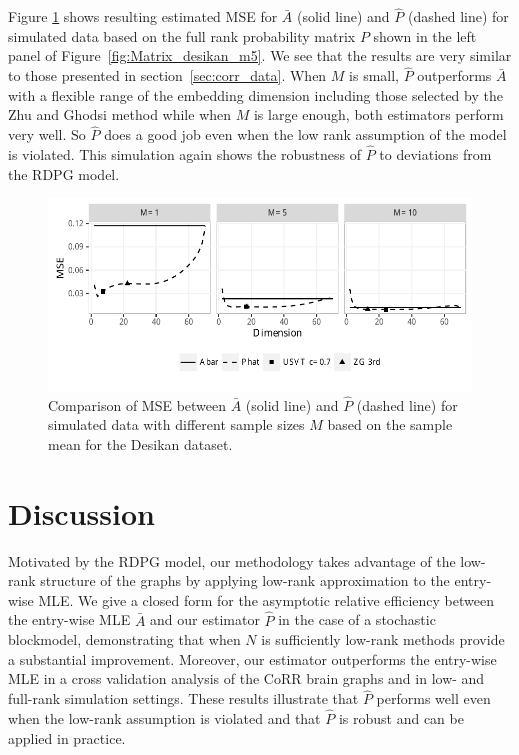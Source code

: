 \documentclass[a4paper]{article}
\begin{document}
Figure \ref{fig:sim_desikan} shows resulting estimated MSE for $\bar{A}$ (solid line) and $\hat{P}$ (dashed line) for simulated data based on the full rank probability matrix $P$ shown in the left panel of Figure~\ref{fig:Matrix_desikan_m5}.
We see that the results are very similar to those presented in section~\ref{sec:corr_data}.
When $M$ is small, $\hat{P}$ outperforms $\bar{A}$ with a flexible range of the embedding dimension including those selected by the Zhu and Ghodsi method while when $M$ is large enough, both estimators perform very well.
So $\hat{P}$ does a good job even when the low rank assumption of the model is violated. This simulation again shows the robustness of $\hat{P}$ to deviations from the RDPG model.


\begin{figure}[!htb]
\centering
\includegraphics[width=1\textwidth]{sim_desikan.pdf}
\caption{Comparison of MSE between $\bar{A}$ (solid line) and $\hat{P}$ (dashed line) for simulated data with different sample sizes $M$ based on the sample mean for the Desikan dataset.}
\label{fig:sim_desikan}
\end{figure}



\section{Discussion}

Motivated by the RDPG model, our methodology takes advantage of the low-rank structure of the graphs by applying low-rank approximation to the entry-wise MLE. 
We give a closed form for the asymptotic relative efficiency between the entry-wise MLE $\bar{A}$ and our estimator $\hat{P}$ in the case of a stochastic blockmodel, demonstrating that when $N$ is sufficiently low-rank methods provide a substantial improvement.
Moreover, our estimator outperforms the entry-wise MLE in a cross validation analysis of the CoRR brain graphs and in low- and full-rank simulation settings.
These results illustrate that $\hat{P}$ performs well even when the low-rank assumption is violated and that $\hat{P}$ is robust and can be applied in practice.
\end{document}

